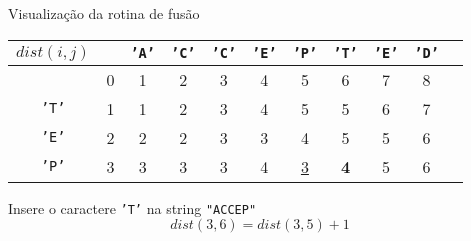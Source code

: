 \begin{frame}[fragile]{Visualização da rotina de fusão}

    \begin{table}
        \centering

        \begin{tabular}{c|cccccccccc} $dist(i, j)$ &
        & \textcolor{red!80!black}{\texttt{'A'}}
        & \textcolor{red!80!black}{\texttt{'C'}}
        & \textcolor{red!80!black}{\texttt{'C'}}
        & \textcolor{red!80!black}{\texttt{'E'}}
        & \textcolor{red!80!black}{\texttt{'P'}}
        & \textcolor{red!80!black}{\texttt{'T'}}
        & \textcolor{red!80!black}{\texttt{'E'}}
        & \textcolor{red!80!black}{\texttt{'D'}}\\
        \hline
&0 &1&2&3&4&5&6&7&8\\
\textcolor{red!80!black}{\texttt{'T'}}
&1 &1&2&3&4&5&5&6&7\\
\textcolor{red!80!black}{\texttt{'E'}}
&2 &2&2&3&3&4&5&5&6\\
\textcolor{red!80!black}{\texttt{'P'}}
&3 &3&3&3&4&\underline{3}&\textbf{4}&5&6\\
        \end{tabular}

    \end{table}

    Insere o caractere
\textcolor{red!80!black}{\texttt{'T'}}
    na string 
\textcolor{red!80!black}{\texttt{"ACCEP"}}
    \[
        dist(3, 6) = dist(3, 5) + 1
    \]    


\end{frame}


